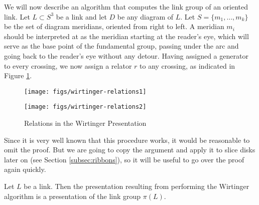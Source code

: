 \documentclass[main.tex]{subfiles}
\begin{document}
We will now describe an algorithm that computes the link group of an oriented link. Let $L \subset S^3$ be a link and let $D$ be any diagram of $L$. Let $S = \{m_1, \dots, m_k\}$ be the set of diagram meridians, oriented from right to left. A meridian $m_i$ should be interpreted at as the meridian starting at the reader's eye, which will serve as the base point of the fundamental group, passing under the arc and going back to the reader's eye without any detour.
Having assigned a generator to every crossing, we now assign a relator $r$ to any crossing, as indicated in Figure \ref{fig:wirtinger-relations}.

\begin{figure}[ht]
\centering
\begin{minipage}{.45\textwidth}
\centering
\texttt{[image: figs/wirtinger-relations1]}
\end{minipage}%
\begin{minipage}{.45\textwidth}
\centering
\texttt{[image: figs/wirtinger-relations2]}
\end{minipage}
\caption{Relations in the Wirtinger Presentation}
\label{fig:wirtinger-relations}
\end{figure}

Since it is very well known that this procedure works, it would be reasonable to omit the proof. But we are going to copy the argument and apply it to slice disks later on (see Section \ref{subsec:ribbons}), so it will be useful to go over the proof again quickly.





\begin{theorem}\label{thm:wirtinger-thm}
Let $L$ be a link.
Then the presentation resulting from performing the Wirtinger algorithm is a presentation of the link group $\pi(L)$.
\end{theorem}
\end{document}
